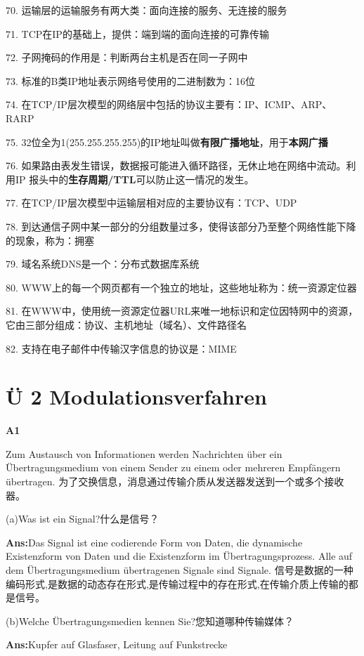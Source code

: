 \documentclass[fleqn]{article}
\begin{document}
70. 运输层的运输服务有两大类：面向连接的服务、无连接的服务

71. TCP在IP的基础上，提供：端到端的面向连接的可靠传输

72. 子网掩码的作用是：判断两台主机是否在同一子网中

73. 标准的B类IP地址表示网络号使用的二进制数为：16位

74. 在TCP/IP层次模型的网络层中包括的协议主要有：IP、ICMP、ARP、RARP

75. 32位全为1(255.255.255.255)的IP地址叫做{\bfseries 有限广播地址}，用于{\bfseries 本网广播}

76. 如果路由表发生错误，数据报可能进入循环路径，无休止地在网络中流动。利用IP 报头中的{\bfseries 生存周期/TTL}可以防止这一情况的发生。

77. 在TCP/IP层次模型中运输层相对应的主要协议有：TCP、UDP

78. 到达通信子网中某一部分的分组数量过多，使得该部分乃至整个网络性能下降的现象，称为：拥塞

79. 域名系统DNS是一个：分布式数据库系统

80. WWW上的每一个网页都有一个独立的地址，这些地址称为：统一资源定位器

81. 在WWW中，使用统一资源定位器URL来唯一地标识和定位因特网中的资源，它由三部分组成：协议、主机地址（域名）、文件路径名

82. 支持在电子邮件中传输汉字信息的协议是：MIME

\clearpage

\section{Ü 2 Modulationsverfahren}

\noindent\textbf{A1}

Zum Austausch von Informationen werden Nachrichten über ein Übertragungsmedium von einem Sender zu einem oder mehreren Empfängern übertragen.
为了交换信息，消息通过传输介质从发送器发送到一个或多个接收器。

(a)Was ist ein Signal?什么是信号？

\textbf{Ans:}Das Signal ist eine codierende Form von Daten, die dynamische Existenzform von Daten und die Existenzform im Übertragungsprozess. Alle auf dem Übertragungsmedium übertragenen Signale sind Signale.
信号是数据的一种编码形式,是数据的动态存在形式,是传输过程中的存在形式,在传输介质上传输的都是信号。

(b)Welche Übertragungsmedien kennen Sie?您知道哪种传输媒体？

\textbf{Ans:}Kupfer auf Glasfaser, Leitung auf Funkstrecke
\end{document}

